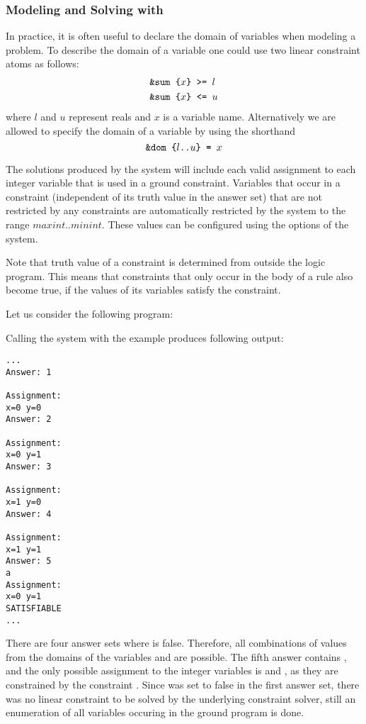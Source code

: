 \subsubsection{Modeling and Solving with \clingcon}
In practice, it is often useful to declare the domain of variables when modeling a problem.
%
To describe the domain of a variable 
one could use two linear constraint atoms as follows:  
\begin{align*}
&\texttt{\&sum\text{ }\{$x$\}\text{ }>=\text{ }$l$}\\
&\texttt{\&sum\text{ }\{$x$\}\text{ }<=\text{ }$u$}
\end{align*}
where $l$ and $u$ represent reals and $x$ is a variable name. 
%
Alternatively we are allowed to specify the domain of a variable by using the shorthand  
\[
\texttt{\&dom\text{ }\{$l$..$u$\}\text{ }=\text{ }$x$}
\]

The solutions produced by the system will include each valid assignment to each integer variable that is
used in a ground constraint.
Variables that occur in a constraint (independent of its truth value in the answer set) that are not
restricted by any constraints are automatically restricted by the system to the range $maxint..minint$.
These values can be configured using the options of the \clingcon{} system.

Note that truth value of a constraint is determined from outside the logic program.
This means that constraints that only occur in the body of a rule also become true,
if the values of its variables satisfy the constraint.

\begin{example}\label{ex:lp:csp2}
Let us consider the following program: 

Calling the system with the example produces following output:
\begin{lstlisting}[numbers=none]
...
Answer: 1

Assignment:
x=0 y=0
Answer: 2

Assignment:
x=0 y=1
Answer: 3

Assignment:
x=1 y=0
Answer: 4

Assignment:
x=1 y=1
Answer: 5
a
Assignment:
x=0 y=1
SATISFIABLE
...
\end{lstlisting}
There are four answer sets where  is false.
Therefore, all combinations of values from the domains of the variables  and  are possible.
The fifth answer contains ,
and the only possible assignment to the integer variables is  and ,
as they are constrained by the constraint .
%
Since  was set to false in the first answer set, 
there was no linear constraint to be solved by the underlying constraint solver, 
still an enumeration of all variables occuring in the ground program is done. 
%
\end{example}

